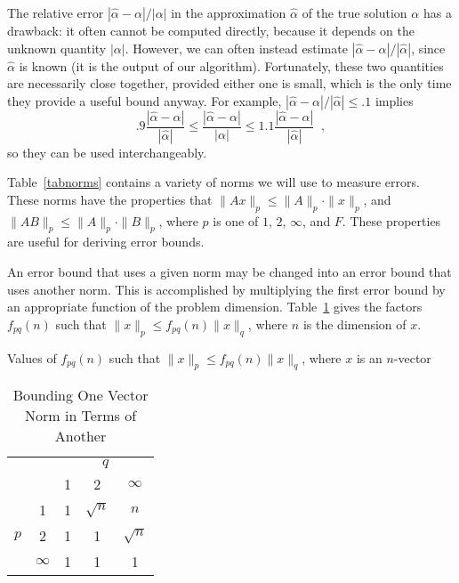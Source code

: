 The relative error $| \hat{\alpha} - \alpha | / | \alpha |$ in the approximation
$\hat{\alpha}$ of the true solution $\alpha$ has a drawback: it often cannot
be computed directly, because it depends on the unknown quantity
$| \alpha |$. However, we can often instead estimate
$| \hat{\alpha} - \alpha | / | \hat{\alpha} |$, since $\hat{\alpha}$ is
known (it is the output of our algorithm). Fortunately, these two
quantities are necessarily close together, provided either one is small,
which is the only time they provide a useful bound anyway. For example,
$| \hat{\alpha} - \alpha | / | \hat{\alpha} | \leq .1$ implies
\[
.9 \frac{| \hat{\alpha} - \alpha |}{| \hat{\alpha} |} \leq
\frac{| \hat{\alpha} - \alpha |}{| {\alpha} |} \leq
1.1 \frac{| \hat{\alpha} - \alpha |}{| \hat{\alpha} |} \; \; ,
\]
so they can be used interchangeably.

Table~\ref{tabnorms} contains a variety of norms we will use to
measure errors.
These norms have the properties that
$\|Ax\|_p \leq \|A\|_p \cdot \|x\|_p$, and
$\|AB\|_p \leq \|A\|_p \cdot \|B\|_p$, where $p$ is one of
$1$, $2$, $\infty$, and $F$. These properties are useful for deriving
error bounds.

An error bound that uses a given norm may be changed into an error bound
that uses another norm. This is accomplished by multiplying the first
error bound by an appropriate function of the problem dimension.
Table~\ref{tableVectorNormFpq} gives the
factors $f_{pq}(n)$ such that $\| x \|_p \leq f_{pq}(n) \|x \|_q$, where
$n$ is the dimension of $x$.

\begin{table}[h]
\caption{Bounding One Vector Norm in Terms of Another}
\label{tableVectorNormFpq}

\begin{center}
Values of $f_{pq}(n)$ such that $\| x \|_p \leq f_{pq}(n) \|x \|_q$, where $x$ is an $n$-vector \\

\begin{tabular}{|cc|c|c|c|}
\hline
    &          & \multicolumn{3}{|c|}{$q$} \\
    &          & \multicolumn{1}{|c}{1} & \multicolumn{1}{c}{2} & \multicolumn{1}{c|}{$\infty$}
\\ \hline
    &     1    & 1 & $\sqrt{n}$ & $n$        \\ \cline{3-5}
$p$ &     2    & 1 &     1      & $\sqrt{n}$ \\ \cline{3-5}
    & $\infty$ & 1 &     1      &     1      \\ \hline
\end{tabular}
\end{center}
\end{table}

